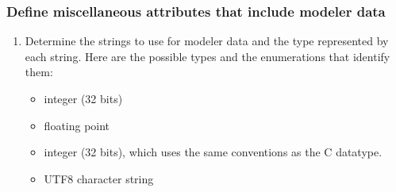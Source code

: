\documentclass[letterpaper,12pt,english,openany,oneside]{sphinxmanual}
\begin{document}
\subsubsection{Define miscellaneous attributes that include modeler data}
\label{\detokenize{Plugins_A3D_API:define-miscellaneous-attributes-that-include-modeler-data}}\begin{enumerate}
%
\item {} 
Determine the strings to use for modeler data and the type represented by each string. Here are the possible types and the enumerations that identify them:
\begin{itemize}
\item {} 
 integer (32 bits)

\item {} 
 floating point

\item {} 
 integer (32 bits), which uses the same conventions as the  C datatype.

\item {} 
 UTF\sphinxhyphen{}8 character string

\end{itemize}

\end{enumerate}
\end{document}
